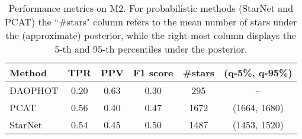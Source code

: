 
\begin{table}[!tb]
\centering
\caption{Performance metrics on M2.
For probabilistic methods (StarNet and PCAT)
the ``\#stars" column refers to the mean number of stars under the (approximate) posterior, while the right-most column displays the 5-th and 95-th percentiles under the posterior. }
\label{tab:summary_stats}
\begin{tabular}{l|ccc|cc}
\toprule
     Method &   TPR &   PPV &  F1 score &  \#stars & (q-5\%, q-95\%)\\
\midrule
    DAOPHOT &  0.20 &  0.63 &      0.30 &     295 & -- \\
       PCAT &  0.56 &  0.40 &      0.47 &    1672 & (1664, 1680)\\
 StarNet &  0.54 &  0.45 &      0.50 &    1487 & (1453, 1520)\\
\bottomrule
\end{tabular}
\end{table}
